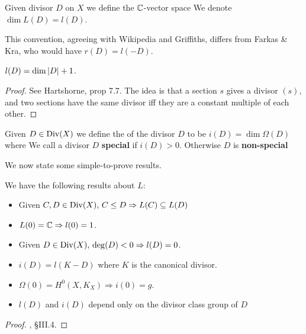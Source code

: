\documentclass{article}
\begin{document}
\begin{definition}
	Given divisor $D$ on $X$ we define the $\mathbb{C}$-vector space 
	We denote $\dim L(D) = l(D)$.
\end{definition}

\begin{remark}
	This convention, agreeing with Wikipedia and Griffiths, differs from Farkas \& Kra, who would have $r(D) = l(-D)$. 
\end{remark}

\begin{lemma}
	$l(D) = \dim \left\lvert D \right\rvert+1$. 
\end{lemma}
\begin{proof}
	See Hartshorne, prop 7.7. The idea is that a section $s$ gives a divisor $(s)$, and two sections have the same divisor iff they are a constant multiple of each other. 
\end{proof}

\begin{definition}
	Given $D \in \operatorname{Div}(X)$ we define the  of the divisor $D$ to be $i(D) = \dim \Omega(D)$ where
We call a divisor $D$ \textbf{special} if $i(D)>0$. Otherwise $D$ is \textbf{non-special}
\end{definition}

We now state some simple-to-prove results.
\begin{prop}
	We have the following results about $L$:
	\begin{itemize}
		\item Given $C,D \in \operatorname{Div}(X), \, C \leq D \Rightarrow L(C) \subseteq L(D)$
		\item $L(0) = \mathbb{C} \Rightarrow l(0) = 1$. 
		\item Given $D \in \operatorname{Div}(X), \, \deg(D)<0 \Rightarrow l(D) = 0$. 
		\item $i(D) = l(K-D)$ where $K$ is the canonical divisor.
		\item $\Omega(0) = H^0(X,K_X) \Rightarrow i(0) = g$. 
		\item $l(D)$ and $i(D)$ depend only on the divisor class group of $D$
	\end{itemize}
\end{prop}
\begin{proof}
\cite{Farkas1992}, \S III.4.
\end{proof}
\end{document}
